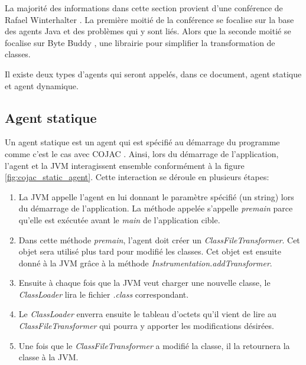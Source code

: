 La majorité des informations dans cette section provient d'une conférence de Rafael Winterhalter \cite{youtube-guide-java-agent}. La première moitié de la conférence se focalise sur la base des agents Java et des problèmes qui y sont liés. Alors que la seconde moitié se focalise sur Byte Buddy \cite{byte-buddy}, une librairie pour simplifier la transformation de classes.

Il existe deux types d'agents qui seront appelés, dans ce document, agent statique et agent dynamique.

\subsection{Agent statique}

Un agent statique est un agent qui est spécifié au démarrage du programme comme c'est le cas avec COJAC \cite{COJAC}. Ainsi, lors du démarrage de l'application, l'agent et la JVM interagissent ensemble conformément à la figure \ref{fig:cojac_static_agent}. Cette interaction se déroule en plusieurs étapes:

\begin{enumerate}
    \item La JVM appelle l'agent en lui donnant le paramètre spécifié (un string) lors du démarrage de l'application. La méthode appelée s'appelle \textit{premain} parce qu'elle est exécutée avant le \textit{main} de l'application cible.
    \item Dans cette méthode \textit{premain}, l'agent doit créer un \textit{ClassFileTransformer}. Cet objet sera utilisé plus tard pour modifié les classes. Cet objet est ensuite donné à la JVM grâce à la méthode \textit{Instrumentation.addTransformer}.
    \item Ensuite à chaque fois que la JVM veut charger une nouvelle classe, le \textit{ClassLoader} lira le fichier \textit{.class} correspondant.
    \item Le \textit{ClassLoader} enverra ensuite le tableau d'octets qu'il vient de lire au \textit{ClassFileTransformer} qui pourra y apporter les modifications désirées.
    \item Une fois que le \textit{ClassFileTransformer} a modifié la classe, il la retournera la classe à la JVM.
\end{enumerate}

\begin{minipage}{\linewidth}%
\label{fig:cojac_static_agent}
\end{minipage}

